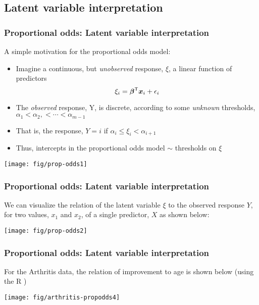 
\subsection{Latent variable interpretation}
\begin{frame}
 \frametitle{Proportional odds: Latent variable interpretation}
A simple motivation for the proportional odds model:
\begin{itemize}
 \item Imagine a continuous, but \emph{unobserved} response, $\xi$,
  a linear function of predictors
\begin{equation*}
\xi_i = \bm{\beta}^\mathsf{T} \bm{x}_i + \epsilon_i
\end{equation*}

 \item The \emph{observed} response, Y, is discrete, according to
 some \emph{unknown} thresholds,
 $\alpha_1 < \alpha_2, <\cdots < \alpha_{m-1}$
 \item That is, the response, $Y = i$ if $ \alpha_i \le \xi_i < \alpha_{i+1}$
 \item Thus, intercepts in the proportional odds model $\sim$ 
thresholds on $\xi$
\end{itemize}

\begin{center}
 \texttt{[image: fig/prop-odds1]}
\end{center}
\end{frame}

\begin{frame}
 \frametitle{Proportional odds: Latent variable interpretation}
We can visualize the relation of the latent variable $\xi$ to
the observed response $Y$, for two values, $x_1$ and $x_2$,
of a single predictor, $X$ as shown below:
\begin{center}
 \texttt{[image: fig/prop-odds2]}
\end{center}
\end{frame}

\begin{frame}
 \frametitle{Proportional odds: Latent variable interpretation}
For the Arthritis data, the relation of improvement to age is
shown below (using the R )
\begin{center}
 \texttt{[image: fig/arthritis-propodds4]}
\end{center}
\end{frame}
